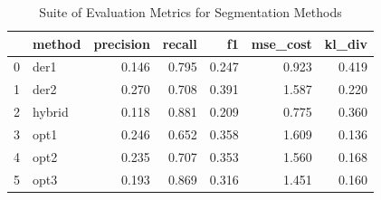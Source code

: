 \begin{table}
\caption{Suite of Evaluation Metrics for Segmentation Methods}
\label{tab:seg_eval}
\begin{tabular}{llrrrrr}
\toprule
 & method & precision & recall & f1 & mse_cost & kl_div \\
\midrule
0 & der1 & 0.146 & 0.795 & 0.247 & 0.923 & 0.419 \\
1 & der2 & 0.270 & 0.708 & 0.391 & 1.587 & 0.220 \\
2 & hybrid & 0.118 & 0.881 & 0.209 & 0.775 & 0.360 \\
3 & opt1 & 0.246 & 0.652 & 0.358 & 1.609 & 0.136 \\
4 & opt2 & 0.235 & 0.707 & 0.353 & 1.560 & 0.168 \\
5 & opt3 & 0.193 & 0.869 & 0.316 & 1.451 & 0.160 \\
\bottomrule
\end{tabular}
\end{table}
